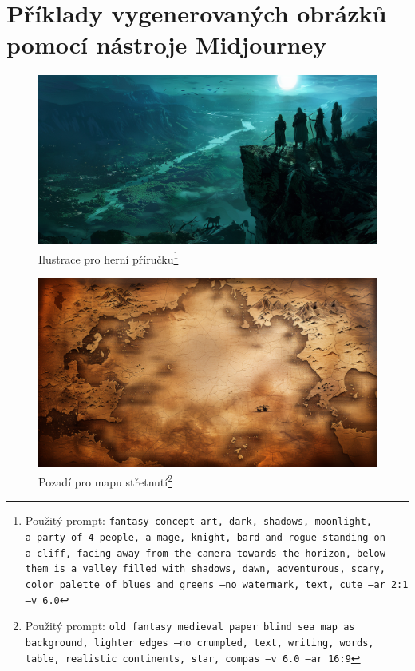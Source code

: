 \chapter{Příklady vygenerovaných obrázků pomocí nástroje Midjourney}

\begin{figure}
  \begin{minipage}{\textwidth}
    \centering
    \includegraphics[width=\textwidth]{resources/figures/theme.png}
    \caption[Ilustrace pro herní příručku]{Ilustrace pro herní příručku\footnote[1]{Použitý prompt: \texttt{fantasy concept art, dark, shadows, moonlight, a~party of 4 people, a~mage, knight, bard and rogue standing on a~cliff, facing away from the camera towards the horizon, below them is a~valley filled with shadows, dawn, adventurous, scary, color palette of blues and greens --no watermark, text, cute --ar 2:1 --v 6.0}}}
    \label{fig:theme}
  \end{minipage}
\end{figure}

\begin{figure}
  \begin{minipage}{\textwidth}
    \centering
    \includegraphics[width=\textwidth]{resources/figures/map.png}
    \caption[Pozadí pro mapu střetnutí]{Pozadí pro mapu střetnutí\footnote[2]{Použitý prompt: \texttt{old fantasy medieval paper blind sea map as background, lighter edges --no crumpled, text, writing, words, table, realistic continents, star, compas --v 6.0 --ar 16:9}}}
    \label{fig:map}
  \end{minipage}
\end{figure}

